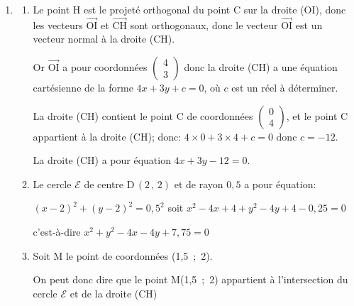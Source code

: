 \documentclass[10pt]{article}
\providecommand{\vectt}[1]{\overrightarrow{\mathrm{#1}}}
\begin{document}
\begin{enumerate}
\begin{enumerate}
	\end{enumerate}
\item
	\begin{enumerate}
		\item 
Le point H est le projeté orthogonal du point C sur la droite (OI), donc les vecteurs $\vectt{OI}$ et $\vectt{CH}$ sont orthogonaux, donc le vecteur $\vectt{OI}$ est un vecteur normal à la droite (CH).

Or $\vectt{OI}$ a pour coordonnées $\begin{pmatrix} 4\\3 \end{pmatrix}$ donc la droite (CH) a une équation cartésienne de la forme $4x+3y+c=0$, où $c$ est un réel à déterminer.

La droite (CH) contient le point C de coordonnées $\begin{pmatrix} 0\\4 \end{pmatrix}$, et le point C appartient à la droite (CH); donc:
$4\times 0 + 3 \times 4 + c=0$ donc $c=-12$.

La droite (CH) a pour équation $4x+3y-12=0$.

		\item 
Le cercle $\mathcal{E}$ de centre D\,$(2\,,\,2)$ et de rayon $0,5$ a pour équation:

$(x-2)^2+(y-2)^2=0,5^2$ soit $x^2-4x+4+y^2-4y+4-0,25=0$

c'est-à-dire $x^2+y^2-4x-4y +7,75=0$

		\item Soit M le point de coordonnées (1,5~;~2).

	
On peut donc dire que le point M(1,5~;~2) appartient à l'intersection du cercle $\mathcal{E}$ et de la droite (CH)	

	\end{enumerate}


\end{enumerate}

\bigskip
\end{document}

